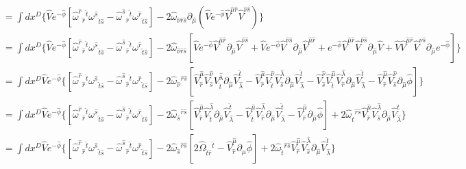 \documentclass{article}
\begin{document}
\begin{equation}
\begin{aligned}
        &= \int d x^D\{  \hat V e^{-\hat \phi}[\hat \omega^{\hat r}{}_{\hat r}{}^{\hat t}\omega^{\hat s}{}_{\hat t \hat s} - \hat \omega^{\hat s}{}_{ \hat r}{}^{\hat t}\omega^{\hat r}{}_{ \hat t \hat s}]- 2 \hat \omega_{\hat \nu \hat r \hat s}\partial_{\hat \mu}(\hat V e^{-\hat \phi} \hat V^{\hat \mu \hat r} \hat V^{\hat \nu \hat s}) \}\\
        &= \int d x^D\{  \hat V e^{-\hat \phi}[\hat \omega^{\hat r}{}_{\hat r}{}^{\hat t}\omega^{\hat s}{}_{\hat t \hat s} - \hat \omega^{\hat s}{}_{ \hat r}{}^{\hat t}\omega^{\hat r}{}_{ \hat t \hat s}]- 2\hat \omega_{\hat \nu \hat r \hat s}[\hat V e^{-\hat \phi} \hat V^{\hat \mu \hat r} \partial_{\hat \mu} \hat V^{\hat \nu \hat s} +\hat V e^{-\hat \phi}  \hat V^{\hat \nu \hat s} \partial_{\hat \mu}\hat V^{\hat \mu \hat r}+ e^{-\hat \phi} \hat V^{\hat \mu \hat r} \hat V^{\hat \nu \hat s} \partial_{\hat \mu}\hat V +\hat V  \hat V^{\hat \mu \hat r} \hat V^{\hat \nu \hat s} \partial_{\hat \mu}e^{-\hat \phi} ] \}\\
        &= \int d x^D\hat V e^{-\hat \phi} \{  [\hat \omega^{\hat r}{}_{\hat r}{}^{\hat t}\omega^{\hat s}{}_{\hat t \hat s} - \hat \omega^{\hat s}{}_{ \hat r}{}^{\hat t}\omega^{\hat r}{}_{ \hat t \hat s}]- 2\hat \omega_{\hat \nu}{}^{\hat r \hat s}[\hat V^{\hat \mu}_{  \hat r} \hat V^{\hat \nu}_{ \hat s}V^{\hat \lambda }_{\hat t} \partial_{\hat \mu}\hat V^{\hat t}_{\hat \lambda}- \hat V^{\hat \mu}_{ \hat r} \hat V^{ \hat \nu}_{\hat t} \hat V^{ \hat \lambda}_{\hat s} \partial_{\hat \mu} \hat V^{ \hat t}_{\hat \lambda} -  \hat V^{\hat \nu}_{ \hat s} \hat V^{ \hat \mu}_{\hat t} \hat V^{ \hat \lambda}_{\hat r} \partial_{\hat \mu} \hat V^{ \hat t}_{\hat \lambda}-  \hat V^{\hat \mu}_{ \hat r} \hat V^{\hat \nu}_{ \hat s} \partial_{\hat \mu}\hat \phi ] \}\\ 
        &= \int d x^D\hat V e^{-\hat \phi} \{  [\hat \omega^{\hat r}{}_{\hat r}{}^{\hat t}\omega^{\hat s}{}_{\hat t \hat s} - \hat \omega^{\hat s}{}_{ \hat r}{}^{\hat t}\omega^{\hat r}{}_{ \hat t \hat s}]- 2\hat \omega_{\hat s}{}^{\hat r \hat s}[\hat V^{\hat \mu}_{  \hat r} \hat V^{\hat \lambda }_{\hat t} \partial_{\hat \mu}\hat V^{\hat t}_{\hat \lambda} -   \hat V^{ \hat \mu}_{\hat t} \hat V^{ \hat \lambda}_{\hat r} \partial_{\hat \mu} \hat V^{ \hat t}_{\hat \lambda}-  \hat V^{\hat \mu}_{ \hat r}\partial_{\hat \mu}\hat \phi ] + 2\hat \omega_{\hat t}{}^{\hat r \hat s} \hat V^{\hat \mu}_{ \hat r} \hat V^{ \hat \lambda}_{\hat s} \partial_{\hat \mu} \hat V^{ \hat t}_{\hat \lambda} \}\\
        &= \int d x^D\hat V e^{-\hat \phi} \{  [\hat \omega^{\hat r}{}_{\hat r}{}^{\hat t}\omega^{\hat s}{}_{\hat t \hat s} - \hat \omega^{\hat s}{}_{ \hat r}{}^{\hat t}\omega^{\hat r}{}_{ \hat t \hat s}]- 2\hat \omega_{\hat s}{}^{\hat r \hat s}[2 \hat \Omega_{ \hat t \hat r}{}^{\hat t}-  \hat V^{\hat \mu}_{ \hat r}\partial_{\hat \mu}\hat \phi ] + 2\hat \omega_{\hat t}{}^{\hat r \hat s} \hat V^{\hat \mu}_{ \hat r} \hat V^{ \hat \lambda}_{\hat s} \partial_{\hat \mu} \hat V^{ \hat t}_{\hat \lambda} \}\\

\end{aligned}
\end{equation}
\end{document}
